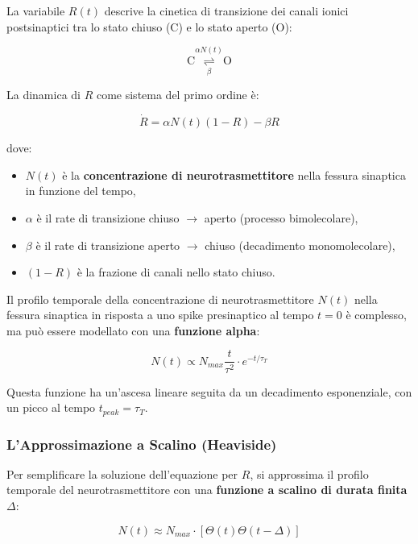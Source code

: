 La variabile $R(t)$ descrive la cinetica di transizione dei canali ionici postsinaptici tra lo stato chiuso (C) e lo stato aperto (O):

\begin{equation}
\text{C} \underset{\beta}{\overset{\alpha N(t)}{\rightleftharpoons}} \text{O}
\end{equation}

La dinamica di $R$ come sistema del primo ordine è:

\begin{equation}
\dot{R} = \alpha N(t)(1-R) - \beta R
\end{equation}

dove:
\begin{itemize}
    \item $N(t)$ è la \textbf{concentrazione di neurotrasmettitore} nella fessura sinaptica in funzione del tempo,
    \item $\alpha$ è il rate di transizione chiuso $\to$ aperto (processo bimolecolare),
    \item $\beta$ è il rate di transizione aperto $\to$ chiuso (decadimento monomolecolare),
    \item $(1-R)$ è la frazione di canali nello stato chiuso.
\end{itemize}



Il profilo temporale della concentrazione di neurotrasmettitore $N(t)$ nella fessura sinaptica in risposta a uno spike presinaptico al tempo $t = 0$ è complesso, ma può essere modellato con una \textbf{funzione alpha}:

\begin{equation}
N(t) \propto N_{max} \frac{t}{\tau^2} \cdot e^{-t/\tau_T}
\end{equation}

Questa funzione ha un'ascesa lineare seguita da un decadimento esponenziale, con un picco al tempo $t_{peak} = \tau_T$.


\subsubsection{L'Approssimazione a Scalino (Heaviside)}

Per semplificare la soluzione dell'equazione per $R$, si approssima il profilo temporale del neurotrasmettitore con una \textbf{funzione a scalino di durata finita} $\Delta$:

\begin{equation}
N(t) \approx N_{max} \cdot [\Theta(t)  \Theta(t - \Delta)]
\end{equation}

